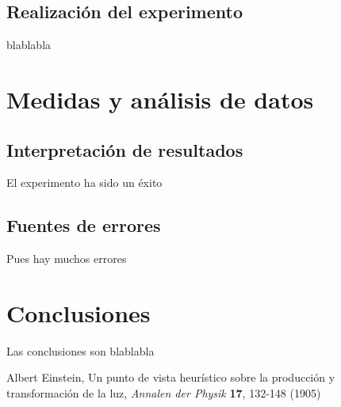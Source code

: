 \documentclass[12pt,a4paper]{article}
\begin{document}
\begin{multicols}{2}
\subsection{Realización del experimento}
blablabla
\section{Medidas y análisis de datos}
\subsection{Interpretación de resultados}
El experimento ha sido un éxito
\subsection{Fuentes de errores}
Pues hay muchos errores

\end{multicols} %
\section{Conclusiones}
Las conclusiones son blablabla

\newpage
\begin{thebibliography}{99} %
 Albert Einstein, Un punto de vista heurístico sobre la producción y transformación de la luz, \textit{Annalen der Physik} \textbf{17}, 132-148 (1905)
\end{thebibliography}
\end{document}
